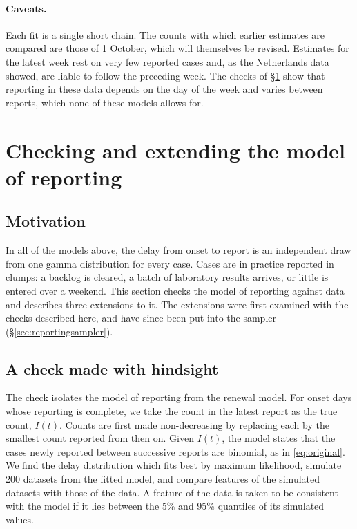 \documentclass[11pt,a4paper]{article}
\begin{document}
\paragraph{Caveats.} Each fit is a single short chain. The counts with which
earlier estimates are compared are those of 1 October, which will themselves
be revised. Estimates for the latest week rest on very few reported cases and,
as the Netherlands data showed, are liable to follow the preceding week. The
checks of \S\ref{sec:reporting} show that reporting in these data depends on
the day of the week and varies between reports, which none of these models
allows for.

\section{Checking and extending the model of reporting}\label{sec:reporting}

\subsection{Motivation}

In all of the models above, the delay from onset to report is an independent
draw from one gamma distribution for every case. Cases are in practice
reported in clumps: a backlog is cleared, a batch of laboratory results
arrives, or little is entered over a weekend. This section checks the model of
reporting against data and describes three extensions to it. The extensions
were first examined with the checks described here, and have since been put
into the sampler (\S\ref{sec:reportingsampler}).

\subsection{A check made with hindsight}

The check isolates the model of reporting from the renewal model. For onset
days whose reporting is complete, we take the count in the latest report as
the true count, $I(t)$. Counts are first made non-decreasing by replacing each
by the smallest count reported from then on. Given $I(t)$, the model states
that the cases newly reported between successive reports are binomial, as in
\eqref{eq:original}. We find the delay distribution which fits best by maximum
likelihood, simulate 200 datasets from the fitted model, and compare features
of the simulated datasets with those of the data. A feature of the data is
taken to be consistent with the model if it lies between the 5\% and 95\%
quantiles of its simulated values.
\end{document}
